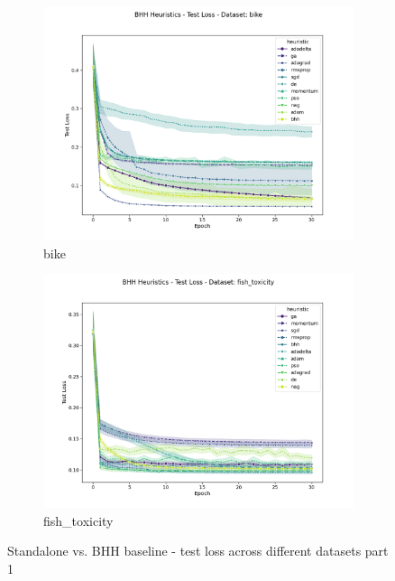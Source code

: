 \begin{figure}[htbp]
\begin{subfigure}{0.48\textwidth}
    	\centering
        \includegraphics[width=\textwidth]{analysis/standalone/figures/test/loss/bike.png}
        \caption{bike}
        \label{fig:results:standalone:figures:test:loss:bike}
	\end{subfigure}
    \begin{subfigure}{0.48\textwidth}
    	\centering
        \includegraphics[width=\textwidth]{analysis/standalone/figures/test/loss/fish_toxicity.png}
        \caption{fish\_toxicity}
        \label{fig:results:standalone:figures:test:loss:fish_toxicity}
	\end{subfigure}
	\caption{Standalone vs. \Acs{BHH} baseline - test loss across different datasets part 1}
	\label{fig:results:standalone:figures:test:loss:various1}
\end{figure}	

